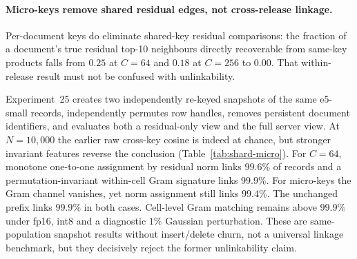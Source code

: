 \paragraph{Micro-keys remove shared residual edges, not cross-release linkage.}\label{ssec:shard-micro}

Per-document keys do eliminate shared-key residual comparisons: the fraction
of a document's true residual top-10 neighbours directly recoverable from
same-key products falls from $0.25$ at $C{=}64$ and $0.18$ at $C{=}256$ to
$0.00$. That within-release result must not be confused with unlinkability.

Experiment~25 creates two independently re-keyed snapshots of the same
e5-small records, independently permutes row handles, removes persistent
document identifiers, and evaluates both a residual-only view and the full
server view. At $N=10{,}000$ the earlier raw cross-key cosine is indeed at
chance, but stronger invariant features reverse the conclusion
(Table~\ref{tab:shard-micro}). For $C{=}64$, monotone one-to-one assignment
by residual norm links $99.6\%$ of records and a permutation-invariant
within-cell Gram signature links $99.9\%$. For micro-keys the Gram channel
vanishes, yet norm assignment still links $99.4\%$. The unchanged prefix
links $99.9\%$ in both cases. Cell-level Gram matching remains above $99.9\%$
under fp16, int8 and a diagnostic $1\%$ Gaussian perturbation. These are
same-population snapshot results without insert/delete churn, not a universal
linkage benchmark, but they decisively reject the former unlinkability claim.

